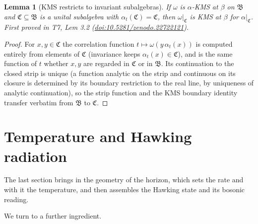 \documentclass[11pt]{article}
\newtheorem{lemma}[theorem]{Lemma}
\theoremstyle{definition}
\theoremstyle{plain}
\begin{document}
\begin{lemma}[KMS restricts to invariant subalgebras]\label{c:hawking.kms-restricts-invariant-subalgebras}
If $\omega$ is $\alpha$-KMS at $\beta$ on $\mathfrak{B}$ and $\mathfrak{C} \subseteq \mathfrak{B}$ is a unital subalgebra with $\alpha_t(\mathfrak{C}) = \mathfrak{C}$, then $\omega|_{\mathfrak{C}}$ is KMS at $\beta$ for $\alpha|_{\mathfrak{C}}$.
\emph{First proved in} T7, Lem 3.2 (\href{https://doi.org/10.5281/zenodo.22722121}{doi:10.5281/zenodo.22722121}).
\end{lemma}
\begin{proof}
For $x, y \in \mathfrak{C}$ the correlation function $t \mapsto \omega(y\,\alpha_t(x))$ is computed entirely from elements of $\mathfrak{C}$ (invariance keeps $\alpha_t(x) \in \mathfrak{C}$), and is the same function of $t$ whether $x, y$ are regarded in $\mathfrak{C}$ or in $\mathfrak{B}$. Its continuation to the closed strip is unique (a function analytic on the strip and continuous on its closure is determined by its boundary restriction to the real line, by uniqueness of analytic continuation), so the strip function and the KMS boundary identity transfer verbatim from $\mathfrak{B}$ to $\mathfrak{C}$.

\end{proof}

\section{Temperature and Hawking radiation}

The last section brings in the geometry of the horizon, which sets the rate and with it the temperature, and then assembles the Hawking state and its bosonic reading.

We turn to a further ingredient.
\end{document}
